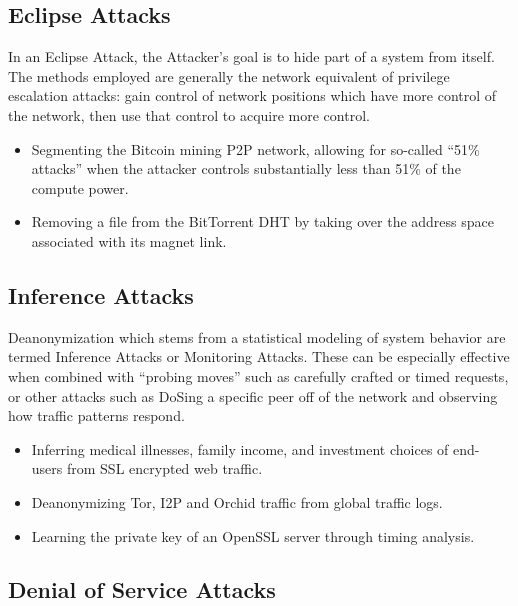 \documentclass{article}
\newcommand{\orchid}{Orchid}
\newcommand{\Orchid}{\orchid}
\begin{document}
\subsection{Eclipse Attacks}

In an Eclipse Attack, the Attacker's goal is to hide part of a system from itself. The methods employed are generally the network equivalent of privilege escalation attacks: gain control of network positions which have more control of the network, then use that control to acquire more control.

\begin{itemize}
\item Segmenting the Bitcoin mining P2P network, allowing for so-called “51\% attacks” when the attacker controls substantially less than 51\% of the compute power\cite{bitcoinEclipse}.
\item Removing a file from the BitTorrent DHT by taking over the address space associated with its magnet link\cite{bittorrentSybilAttacks}.
\end{itemize}

\subsection{Inference Attacks}
\label{inference-attacks}

Deanonymization which stems from a statistical modeling of system behavior are termed Inference Attacks or Monitoring Attacks. These can be especially effective when combined with “probing moves” such as carefully crafted or timed requests, or other attacks such as DoSing a specific peer off of the network and observing how traffic patterns respond.

\begin{itemize}
\item Inferring medical illnesses, family income, and investment choices of end- users from SSL encrypted web traffic\cite{broadInferenceAttacks}.
\item Deanonymizing Tor, I2P and \Orchid{} traffic from global traffic logs\cite{mixTrafficAnalysis}.
\item Learning the private key of an OpenSSL server through timing analysis\cite{opensslTimingAttack}.
\end{itemize}

\subsection{Denial of Service Attacks}
\end{document}
